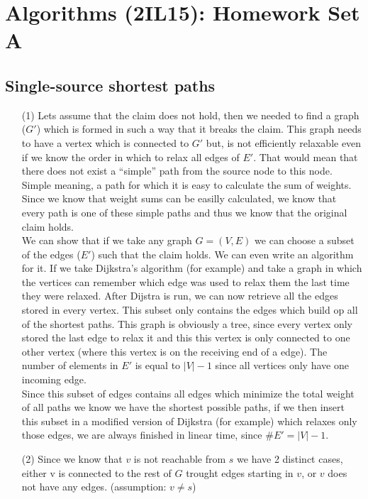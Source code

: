 \documentclass{article}
\title{}
\author{Mart Pluijmaekers}
\date{3-12-2012}
\begin{document}
\section*{Algorithms (2IL15): Homework Set A}

\subsection*{Single-source shortest paths}
\begin{itemize}
\item[(1)] Lets assume that the claim does not hold, then we needed to find a graph ($G'$) which is formed in such a way that it breaks the claim. This graph needs to have a vertex which is connected to $G'$ but, is not efficiently relaxable even if we know the order in which to relax all edges of $E'$. That would mean that there does not exist a ``simple'' path from the source node to this node. Simple meaning, a path for which it is easy to calculate the sum of weights. Since we know that weight sums can be easilly calculated, we know that every path is one of these simple paths and thus we know that the original claim holds. \\

We can show that if we take any graph $G=(V,E)$ we can choose a subset of the edges ($E'$) such that the claim holds. We can even write an algorithm for it. If we take Dijkstra's algorithm (for example) and take a graph in which the vertices can remember which edge was used to relax them the last time they were relaxed. After Dijstra is run, we can now retrieve all the edges stored in every vertex. This subset only contains the edges which build op all of the shortest paths. This graph is obviously a tree, since every vertex only stored the last edge to relax it and this this vertex is only connected to one other vertex (where this vertex is on the receiving end of a edge). The number of elements in $E'$ is equal to $|V|-1$ since all vertices only have one incoming edge.\\

Since this subset of edges contains all edges which minimize the total weight of all paths  we know we have the shortest possible paths, if we then insert this subset in a modified version of Dijkstra (for example) which relaxes only those edges, we are always finished in linear time, since $\#E'=|V|-1$.


\item[(2)]  Since we know that $v$ is not reachable from $s$ we have 2 distinct cases, either v is connected to the rest of $G$ trought edges starting in $v$, or $v$ does not have any edges. (assumption: $v \ne s$)


\end{itemize}
\end{document}

